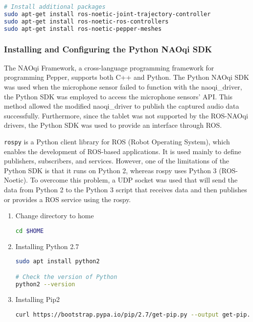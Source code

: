 \documentclass{CSSRforAfrica}
\begin{document}
{\begin{lstlisting}[style=withoutNumbering, language=bash]
# Install additional packages
sudo apt-get install ros-noetic-joint-trajectory-controller
sudo apt-get install ros-noetic-ros-controllers
sudo apt-get install ros-noetic-pepper-meshes

\end{lstlisting}
\subsubsection*{Installing and Configuring the Python NAOqi SDK}
{
The NAOqi Framework, a cross-language programming framework for programming Pepper, supports both C++ and Python. The Python NAOqi SDK was used when the microphone sensor failed to function with the naoqi\_driver, the Python SDK was employed to access the microphone sensors' API. This method allowed the modified naoqi\_driver to publish the captured audio data successfully. Furthermore, since the tablet was not supported by the ROS-NAOqi drivers, the Python SDK was used to provide an interface through ROS. 

\texttt{rospy} is a Python client library for ROS (Robot Operating System), which enables the development of ROS-based applications. It is used mainly to define publishers, subscribers, and services. However, one of the limitations of the Python SDK is that it runs on Python 2, whereas rospy uses Python 3 (ROS-Noetic). To overcome this problem, a UDP socket was used that will send the data from Python 2 to the Python 3 script that receives data and then publishes or provides a ROS service using the rospy.

\begin{enumerate}
\item Change directory to home  
\begin{lstlisting}[style=withoutNumbering, language=bash]
cd $HOME
\end{lstlisting}

\item Installing Python 2.7 
\begin{lstlisting}[style=withoutNumbering, language=bash]
sudo apt install python2

# Check the version of Python
python2 --version
\end{lstlisting}

\item Installing Pip2 
\begin{lstlisting}[style=withoutNumbering, language=bash]
curl https://bootstrap.pypa.io/pip/2.7/get-pip.py --output get-pip.py
\end{lstlisting}


\end{enumerate}}}
\end{document}
